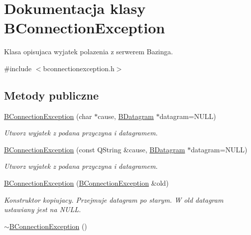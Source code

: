 \hypertarget{class_b_connection_exception}{
\section{Dokumentacja klasy BConnectionException}
\label{class_b_connection_exception}
}


Klasa opisujaca wyjatek polazenia z serwerem Bazinga.  


{\ttfamily \#include $<$bconnectionexception.h$>$}\subsection*{Metody publiczne}
\begin{DoxyCompactItemize}
\item 
\hypertarget{class_b_connection_exception_a8434b332707e6b981af493ac142ddc34}{
\hyperlink{class_b_connection_exception_a8434b332707e6b981af493ac142ddc34}{BConnectionException} (char $\ast$cause, \hyperlink{class_b_datagram}{BDatagram} $\ast$datagram=NULL)}
\label{class_b_connection_exception_a8434b332707e6b981af493ac142ddc34}

\begin{DoxyCompactList}\small\item\em Utworz wyjatek z podana przyczyna i datagramem. \item\end{DoxyCompactList}\item 
\hypertarget{class_b_connection_exception_ae805b541430e9a3e2af7750a4385ca64}{
\hyperlink{class_b_connection_exception_ae805b541430e9a3e2af7750a4385ca64}{BConnectionException} (const QString \&cause, \hyperlink{class_b_datagram}{BDatagram} $\ast$datagram=NULL)}
\label{class_b_connection_exception_ae805b541430e9a3e2af7750a4385ca64}

\begin{DoxyCompactList}\small\item\em Utworz wyjatek z podana przyczyna i datagramem. \item\end{DoxyCompactList}\item 
\hypertarget{class_b_connection_exception_aa28e0f3ae8e5dc4a2154f106a289e470}{
\hyperlink{class_b_connection_exception_aa28e0f3ae8e5dc4a2154f106a289e470}{BConnectionException} (\hyperlink{class_b_connection_exception}{BConnectionException} \&old)}
\label{class_b_connection_exception_aa28e0f3ae8e5dc4a2154f106a289e470}

\begin{DoxyCompactList}\small\item\em Konstruktor kopiujacy. Przejmuje datagram po starym. W old datagram ustawiany jest na NULL. \item\end{DoxyCompactList}\item 
\hypertarget{class_b_connection_exception_aba3b955d554c45bbd279bd75e65e74f5}{
\hyperlink{class_b_connection_exception_aba3b955d554c45bbd279bd75e65e74f5}{$\sim$BConnectionException} ()}
\label{class_b_connection_exception_aba3b955d554c45bbd279bd75e65e74f5}


\end{DoxyCompactItemize}
